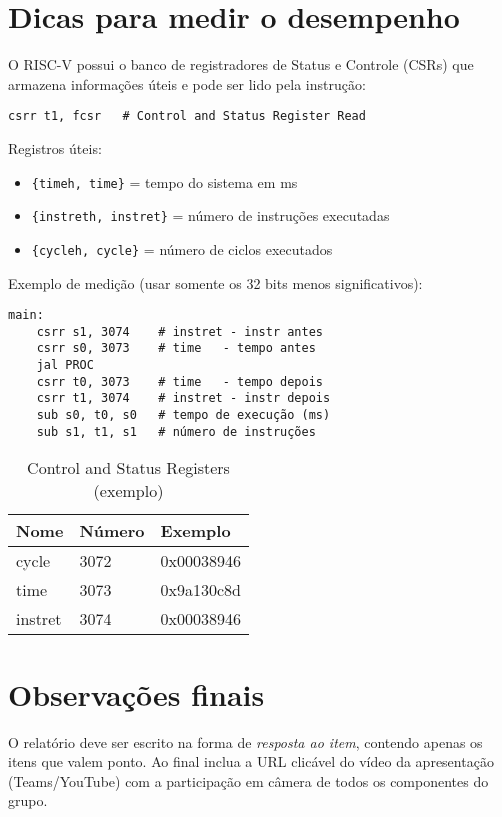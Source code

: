 \documentclass[12pt,a4paper]{article}
\begin{document}
\newpage
\section*{Dicas para medir o desempenho}
O RISC-V possui o banco de registradores de Status e Controle (CSRs) que armazena informações úteis e pode ser lido pela instrução:
\begin{verbatim}
csrr t1, fcsr   # Control and Status Register Read
\end{verbatim}
Registros úteis:
\begin{itemize}
    \item \texttt{\{timeh, time\}} = tempo do sistema em ms
    \item \texttt{\{instreth, instret\}} = número de instruções executadas
    \item \texttt{\{cycleh, cycle\}} = número de ciclos executados
\end{itemize}

Exemplo de medição (usar somente os 32 bits menos significativos):
\begin{verbatim}
main:
    csrr s1, 3074    # instret - instr antes
    csrr s0, 3073    # time   - tempo antes
    jal PROC
    csrr t0, 3073    # time   - tempo depois
    csrr t1, 3074    # instret - instr depois
    sub s0, t0, s0   # tempo de execução (ms)
    sub s1, t1, s1   # número de instruções
\end{verbatim}

\begin{table}[H]
\centering
\caption{Control and Status Registers (exemplo)}
\begin{tabular}{@{}lll@{}}
\toprule
Nome & Número & Exemplo \\ \midrule
cycle & 3072 & 0x00038946 \\
time & 3073 & 0x9a130c8d \\
instret & 3074 & 0x00038946 \\
\bottomrule
\end{tabular}
\end{table}

\section*{Observações finais}
O relatório deve ser escrito na forma de \emph{resposta ao item}, contendo apenas os itens que valem ponto. Ao final inclua a URL clicável do vídeo da apresentação (Teams/YouTube) com a participação em câmera de todos os componentes do grupo.
\end{document}
